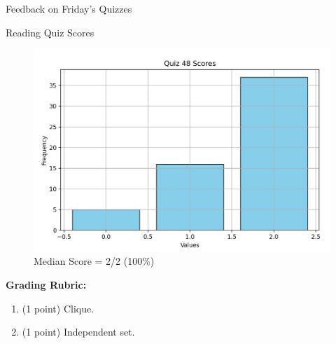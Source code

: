 \documentclass[10pt]{beamer}
\begin{document}
\begin{frame}[standout]
Feedback on Friday's Quizzes
\end{frame}


\begin{frame}{Reading Quiz Scores}
\small 
\begin{figure}[ht]
        \centering
        \includegraphics[width=.7\textwidth]{images/reading_quiz_scores}
   		 \caption{Median Score = 2/2 (100\%)}
\end{figure}
\vfill 
\textbf{Grading Rubric:}  
\begin{enumerate}
\item (1 point) Clique.
\item (1 point) Independent set.
\end{enumerate}







\end{frame}	
\end{document}
